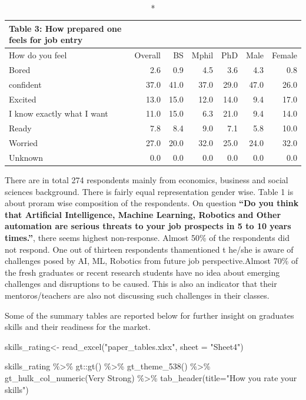 \documentclass[
  12pt]{article}
\newenvironment{Shaded}{\begin{snugshade}}{\end{snugshade}}
\newcommand{\AttributeTok}[1]{\textcolor[rgb]{0.40,0.45,0.13}{#1}}
\newcommand{\FunctionTok}[1]{\textcolor[rgb]{0.28,0.35,0.67}{#1}}
\newcommand{\NormalTok}[1]{\textcolor[rgb]{0.00,0.23,0.31}{#1}}
\newcommand{\OtherTok}[1]{\textcolor[rgb]{0.00,0.23,0.31}{#1}}
\newcommand{\SpecialCharTok}[1]{\textcolor[rgb]{0.37,0.37,0.37}{#1}}
\newcommand{\StringTok}[1]{\textcolor[rgb]{0.13,0.47,0.30}{#1}}
\begin{document}
\captionsetup[table]{labelformat=empty,skip=1pt}
\begin{longtable}{lrrrrrr}
\caption*{
{\large Table 3: How prepared one feels for job entry}
} \\ 
\toprule
How do you feel & Overall & BS & Mphil & PhD & Male & Female \\ 
\midrule
Bored & 2.6 & 0.9 & 4.5 & 3.6 & 4.3 & 0.8 \\ 
confident & 37.0 & 41.0 & 37.0 & 29.0 & 47.0 & 26.0 \\ 
Excited & 13.0 & 15.0 & 12.0 & 14.0 & 9.4 & 17.0 \\ 
I know exactly what I want & 11.0 & 15.0 & 6.3 & 21.0 & 9.4 & 14.0 \\ 
Ready & 7.8 & 8.4 & 9.0 & 7.1 & 5.8 & 10.0 \\ 
Worried & 27.0 & 20.0 & 32.0 & 25.0 & 24.0 & 32.0 \\ 
Unknown & 0.0 & 0.0 & 0.0 & 0.0 & 0.0 & 0.0 \\ 
\bottomrule
\end{longtable}

There are in total 274 respondents mainly from economics, business and
social sciences background. There is fairly equal representation gender
wise. Table 1 is about proram wise composition of the respondents. On
question \textbf{``Do you think that Artificial Intelligence, Machine
Learning, Robotics and Other automation are serious threats to your job
prospects in 5 to 10 years times.''}, there seems highest non-response.
Almost 50\% of the respondents did not respond. One out of thirteen
respondents thamentioned t he/she is aware of challenges posed by AI,
ML, Robotics from future job perspective.Almost 70\% of the fresh
graduates or recent research students have no idea about emerging
challenges and disruptions to be caused. This is also an indicator that
their mentoros/teachers are also not discussing such challenges in their
classes.

Some of the summary tables are reported below for further insight on
graduates skills and their readiness for the market.

\begin{Shaded}
\begin{Highlighting}[]
\NormalTok{skills\_rating}\OtherTok{\textless{}{-}} \FunctionTok{read\_excel}\NormalTok{(}\StringTok{"paper\_tables.xlsx"}\NormalTok{,   }\AttributeTok{sheet =} \StringTok{"Sheet4"}\NormalTok{)}

\NormalTok{skills\_rating }\SpecialCharTok{\%\textgreater{}\%}\NormalTok{ gt}\SpecialCharTok{::}\FunctionTok{gt}\NormalTok{() }\SpecialCharTok{\%\textgreater{}\%} 
  \FunctionTok{gt\_theme\_538}\NormalTok{() }\SpecialCharTok{\%\textgreater{}\%}
  \FunctionTok{gt\_hulk\_col\_numeric}\NormalTok{(}\StringTok{\textasciigrave{}}\AttributeTok{Very Strong}\StringTok{\textasciigrave{}}\NormalTok{) }\SpecialCharTok{\%\textgreater{}\%}  \FunctionTok{tab\_header}\NormalTok{(}\AttributeTok{title=}\StringTok{"How you rate your skills"}\NormalTok{)}
\end{Highlighting}
\end{Shaded}
\end{document}
